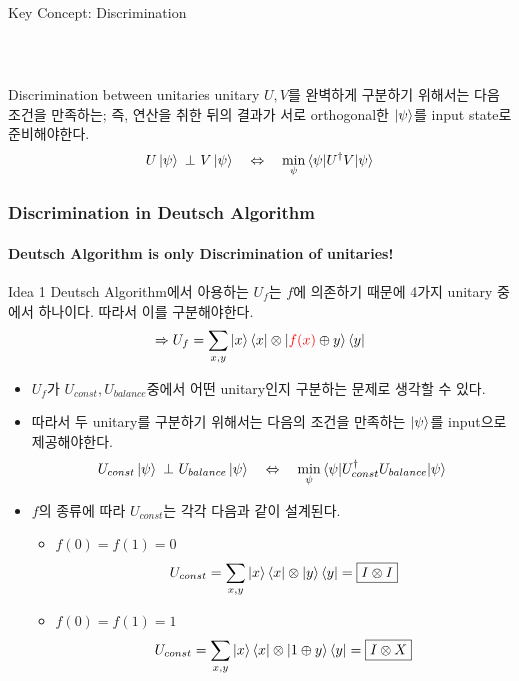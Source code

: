 \documentclass[9pt]{beamer}
\begin{document}
\begin{section}{Key Concept: Discrimination}
\begin{frame}
\begin{columns}
\begin{column}{0.5\textwidth}
\begin{table}[h]
\[\begin{array}{c}
{                        }
                        \end{array}
                        \]
                    \end{table}
                \end{column}
            \end{columns}
            \vspace{-0.3cm}
            \begin{block}{Discrimination between unitaries}
                unitary $U, V$를 완벽하게 구분하기 위해서는 다음 조건을 만족하는; 즉, 연산을 취한 뒤의 결과가 서로 \alert{orthogonal}한 $\ket \psi$를 input state로 준비해야한다.
                $$U\ket \psi\ \bot\ V \ket \psi \quad \Leftrightarrow \quad \min_\psi \braket{\psi|U^\dagger V|\psi}$$
            \end{block}
        \end{frame}

        \begin{frame}
            \frametitle{Discrimination in Deutsch Algorithm}
            \framesubtitle{Deutsch Algorithm is only Discrimination of unitaries!}
            \begin{alertblock}{Idea 1}
                Deutsch Algorithm에서 아용하는 $U_f$는 $f$에 의존하기 때문에 4가지 unitary 중에서 하나이다. 따라서 이를 구분해야한다.
                $$\Rightarrow U_f = \sum_{x,y} \ket x \bra x \otimes  \ket{{\color{red}{f(x)}}\oplus y} \bra y$$ 
            \end{alertblock}
            \begin{itemize}
                \item $U_f$가 $U_{const}, U_{balance}$중에서 어떤 unitary인지 구분하는 문제로 생각할 수 있다.
                \item 따라서 두 unitary를 구분하기 위해서는 다음의 조건을 만족하는 $\ket{\psi}$를 input으로 제공해야한다.
                  $$U_{const}\ket \psi\ \bot\ U_{balance} \ket \psi \quad \Leftrightarrow \quad \min_\psi \braket{\psi|U_{const}^\dagger U_{balance}|\psi}$$
                \item $f$의 종류에 따라 $U_{const}$는 각각 다음과 같이 설계된다.
                \begin{itemize}
                    \item $f(0) = f(1) = 0$
                    $$U_{const} = \sum_{x,y} \ket x \bra x \otimes \ket y \bra y = \boxed{I\otimes I}$$
                    \item $f(0) = f(1) = 1$
                    $$U_{const} = \sum_{x,y} \ket x \bra x \otimes \ket {1 \oplus y } \bra y = \boxed{I\otimes X}$$
                \end{itemize}
            \end{itemize}


\end{frame}
\end{section}
\end{document}
